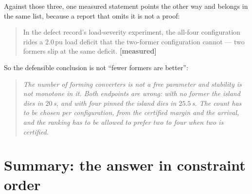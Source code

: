\documentclass[12pt,a4paper]{article}
\theoremstyle{remark}
\newcommand{\pu}{\,\mathrm{pu}}
\newcommand{\measured}{\textcolor{ok}{\textbf{[measured]}}}
\begin{document}
Against those three, one measured statement points the other way and belongs in
the same list, because a report that omits it is not a proof:

\begin{quote}
In the defect record's load-severity experiment, the all-four configuration rides
a $2.0\pu$ load deficit that the two-former configuration cannot --- two formers
slip at the same deficit. \measured
\end{quote}

So the defensible conclusion is not ``fewer formers are better'':

\begin{quote}\small\itshape
The number of forming converters is not a free parameter and stability is not
monotone in it. Both endpoints are wrong: with no former the island dies in
$20$\,s, and with four pinned the island dies in $25.5$\,s. The count has to be
chosen per configuration, from the certified margin and the arrival, and the
ranking has to be allowed to prefer two to four when two is certified.
\end{quote}

\section{Summary: the answer in constraint order}
\end{document}
